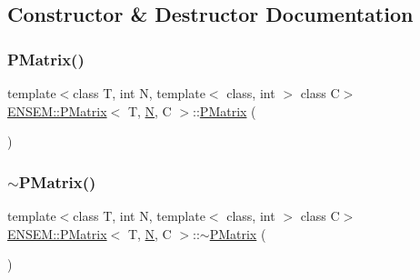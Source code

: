 \subsection{Constructor \& Destructor Documentation}
\mbox{\label{classENSEM_1_1PMatrix_ae32acebccb43c577a9e4dde0866a6c78}} 
\subsubsection{\texorpdfstring{PMatrix()}{PMatrix()}\hspace{0.1cm}{\footnotesize\ttfamily [1/2]}}
{\footnotesize\ttfamily template$<$class T, int N, template$<$ class, int $>$ class C$>$ \\
\mbox{\hyperlink{classENSEM_1_1PMatrix}{E\+N\+S\+E\+M\+::\+P\+Matrix}}$<$ T, \mbox{\hyperlink{operator__name__util_8cc_a7722c8ecbb62d99aee7ce68b1752f337}{N}}, C $>$\+::\mbox{\hyperlink{classENSEM_1_1PMatrix}{P\+Matrix}} (\begin{DoxyParamCaption}{ }\end{DoxyParamCaption})\hspace{0.3cm}{\ttfamily [inline]}}

\mbox{\label{classENSEM_1_1PMatrix_a3196ba50adba3cc1e72bb29ce0b02cda}} 
\subsubsection{\texorpdfstring{$\sim$PMatrix()}{~PMatrix()}\hspace{0.1cm}{\footnotesize\ttfamily [1/2]}}
{\footnotesize\ttfamily template$<$class T, int N, template$<$ class, int $>$ class C$>$ \\
\mbox{\hyperlink{classENSEM_1_1PMatrix}{E\+N\+S\+E\+M\+::\+P\+Matrix}}$<$ T, \mbox{\hyperlink{operator__name__util_8cc_a7722c8ecbb62d99aee7ce68b1752f337}{N}}, C $>$\+::$\sim$\mbox{\hyperlink{classENSEM_1_1PMatrix}{P\+Matrix}} (\begin{DoxyParamCaption}{ }\end{DoxyParamCaption})\hspace{0.3cm}{\ttfamily [inline]}}


